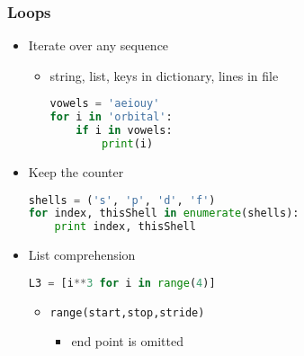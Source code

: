 \documentclass[xcolor=table,10pt,final]{beamer}
\begin{document}
\begin{frame}[fragile]
  \frametitle{Loops}
  \begin{itemize}
    \item Iterate over any sequence
      \begin{itemize}
        \item string, list, keys in dictionary, lines in file\\
  \begin{lstlisting}[language=python]
vowels = 'aeiouy'
for i in 'orbital':
    if i in vowels:
        print(i)
\end{lstlisting}
\end{itemize}
  \item Keep the counter\\
\begin{lstlisting}[language=python]
shells = ('s', 'p', 'd', 'f')
for index, thisShell in enumerate(shells):
    print index, thisShell
    \end{lstlisting}
  \item List comprehension\\
\begin{lstlisting}[language=python]
L3 = [i**3 for i in range(4)]
\end{lstlisting}
\begin{itemize}
  \item {\tt range(start,stop,stride)}
    \begin{itemize}
      \item end point is omitted
    \end{itemize}
\end{itemize}
\end{itemize}
\end{frame}
\end{document}
